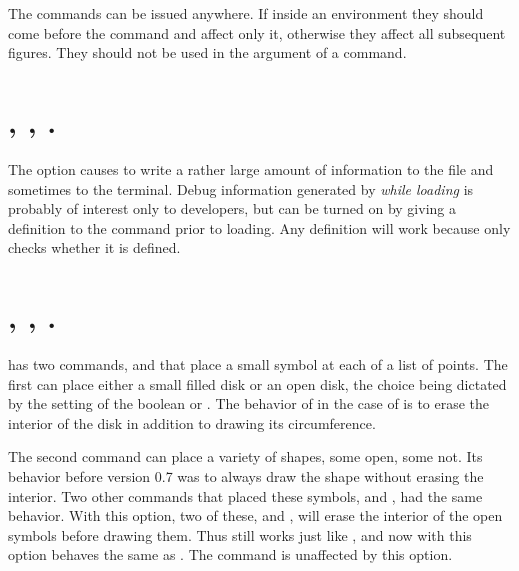 \documentclass[letterpaper]{article}
\begin{document}
The commands can be issued anywhere. If inside an 
environment they should come before the  command and affect
only it, otherwise they affect all subsequent figures. They should not
be used in the argument of a  command.


\section{, ,
.}\label{debug}
%
%

The  option causes \mfp{} to write a rather large amount of
information to the  file and sometimes to the terminal. Debug
information generated by  \emph{while loading} is
probably of interest only to developers, but can be turned on by giving
a definition to the command  prior to loading. Any
definition will work because  only checks whether it is
defined.


\section{, , .}
%
%

\Mfp{} has two commands,  and  that place a
small symbol at each of a list of points. The first can place either a
small filled disk or an open disk, the choice being dictated by the
setting of the boolean  or . The
behavior of  in the case of  is to erase the
interior of the disk in addition to drawing its circumference.

The second command  can place a variety of shapes, some
open, some not. Its behavior before version 0.7 was to always draw the
shape without erasing the interior. Two other commands that placed these
symbols,  and , had the same behavior. With this
option, two of these,  and , will erase the
interior of the open symbols before drawing them. Thus
 still works just like
, and now with this option
 behaves the same as
. The  command is unaffected by
this option.
\end{document}
